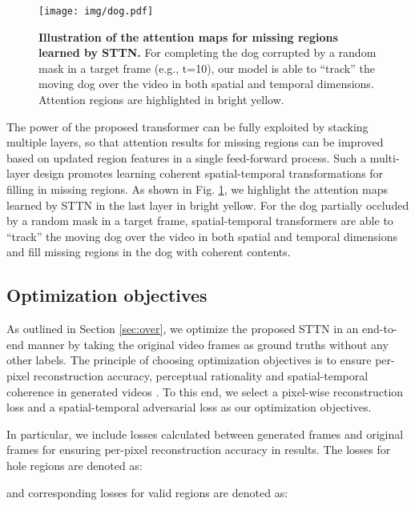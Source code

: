 \documentclass[runningheads]{llncs}
\begin{document}
\begin{figure}[t]
   \begin{center}
      \texttt{[image: img/dog.pdf]}
   \end{center}
   \caption{\textbf{Illustration of the attention maps for missing regions learned by STTN.} For completing the dog corrupted by a random mask in a target frame (e.g., t=10), our model is able to ``track'' the moving dog over the video in both spatial and temporal dimensions. Attention regions are highlighted in bright yellow.}
   \label{fig:attn-dog}
\end{figure}

The power of the proposed transformer can be fully exploited by stacking multiple layers, so that attention results for missing regions can be improved based on updated region features in a single feed-forward process. Such a multi-layer design promotes learning coherent spatial-temporal transformations for filling in missing regions. 
As shown in Fig. \ref{fig:attn-dog}, we highlight the attention maps learned by STTN in the last layer in bright yellow. 
For the dog partially occluded by a random mask in a target frame, spatial-temporal transformers are able to ``track'' the moving dog over the video in both spatial and temporal dimensions and fill missing regions in the dog with coherent contents. 


 

\subsection{Optimization objectives}
\label{sec:opt}
As outlined in Section \ref{sec:over}, we optimize the proposed STTN in an end-to-end manner by taking the original video frames as ground truths without any other labels. The principle of choosing optimization objectives is to ensure per-pixel reconstruction accuracy, perceptual rationality and spatial-temporal coherence in generated videos \cite{chang2019free,gatys2016image,johnson2016perceptual,lee2019copy}. To this end, we select a pixel-wise reconstruction loss and a spatial-temporal adversarial loss as our optimization objectives.

In particular, we include  losses calculated between generated frames and original frames for ensuring per-pixel reconstruction accuracy in results. The  losses for hole regions are denoted as:

and corresponding  losses for valid regions are denoted as:
\end{document}
